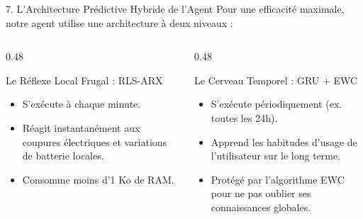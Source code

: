 \documentclass[10pt,aspectratio=169]{beamer}
\begin{document}
\begin{frame}{7. L'Architecture Prédictive Hybride de l'Agent}
  Pour une efficacité maximale, notre agent utilise une architecture à deux niveaux :
  
  \vspace{0.5em}
  \begin{columns}[T]
    \begin{column}{0.48\textwidth}
      \begin{block}{Le Réflexe Local Frugal : RLS-ARX}
        \begin{itemize}
          \item S'exécute à chaque minute.
          \item Réagit instantanément aux coupures électriques et variations de batterie locales.
          \item Consomme moins d'1 Ko de RAM.
        \end{itemize}
      \end{block}
    \end{column}
    
    \begin{column}{0.48\textwidth}
      \begin{block}{Le Cerveau Temporel : GRU + EWC}
        \begin{itemize}
          \item S'exécute périodiquement (ex. toutes les 24h).
          \item Apprend les habitudes d'usage de l'utilisateur sur le long terme.
          \item Protégé par l'algorithme EWC pour ne pas oublier ses connaissances globales.
        \end{itemize}
      \end{block}
    \end{column}
  \end{columns}
\end{frame}
\end{document}
